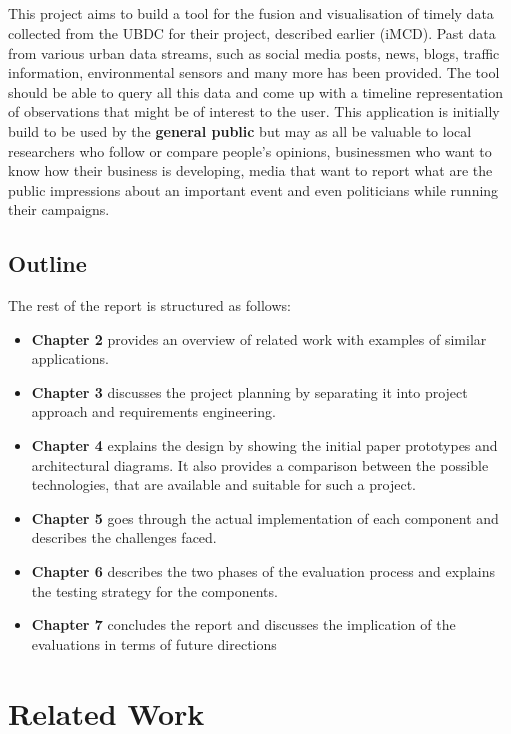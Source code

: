\documentclass{l4proj}
\begin{document}
\paragraph{}
This project aims to build a tool for the fusion and visualisation of timely data collected from the UBDC for their project, described earlier (iMCD). Past data from various urban data streams, such as social media posts, news, blogs, traffic information, environmental sensors and many more has been provided. The tool should be able to query all this data and come up with a timeline representation of observations that might be of interest to the user. This application is initially build to be used by the \textbf{general public} but may as all be valuable to local researchers who follow or compare people’s opinions, businessmen who want to know how their business is developing, media that want to report what are the public impressions about an important event and even politicians while running their campaigns.   

\section{Outline}
The rest of the report is structured as follows:
\begin{itemize}
	\item \textbf{Chapter 2} provides an overview of related work with examples of similar applications.
	
	\item \textbf{Chapter 3} discusses the project planning by separating it into project approach and requirements engineering.
	\item \textbf{Chapter 4} explains the design by showing the initial paper prototypes and architectural diagrams. It also provides a comparison between the possible technologies, that are available and suitable for such a project.
	\item \textbf{Chapter 5} goes through the actual implementation of each component and describes the challenges faced. 
	\item \textbf{Chapter 6} describes the two phases of the evaluation process and explains the testing strategy for the components.
	\item \textbf{Chapter 7} concludes the report and discusses the implication of the evaluations in terms of future directions
\end{itemize}


\chapter{Related Work}
\end{document}
